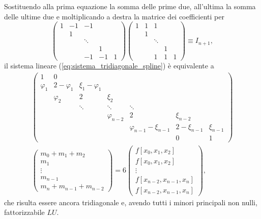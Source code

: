 Sostituendo alla prima equazione la somma delle prime due, all'ultima la somma delle ultime due e moltiplicando a destra la matrice dei coefficienti per
\begin{equation*}
    \begin{pmatrix}
        1 & -1 & -1&&\\
        & 1 &&&\\
        &&\ddots&&\\
        &&&1&\\
        &&-1&-1&1
    \end{pmatrix} \begin{pmatrix}
        1 & 1 & 1&&\\
        & 1 &&&\\
        &&\ddots&&\\
        &&&1&\\
        &&1&1&1
    \end{pmatrix}\equiv I_{n+1},
\end{equation*}
il sistema lineare (\ref{eq:sistema_tridiagonale_spline}) è equivalente a
\begin{equation}
    \begin{matrix}
        \begin{pmatrix}
        1 & 0 & &&&& \\
        \varphi_1 & 2-\varphi_1 & \xi_1-\varphi_1&&&&\\
        &\varphi_2 & 2 &\xi_2&&&\\
        &&\ddots & \ddots &\ddots&&\\
        && & \varphi_{n-2} & 2&\xi_{n-2}&\\
        &&&&\varphi_{n-1}-\xi_{n-1} & 2-\xi_{n-1} &\xi_{n-1}\\
        &&&&& 0 & 1
    \end{pmatrix}\\
    \begin{pmatrix}
        m_0+m_1+m_2\\
        m_1\\
        \vdots\\
        m_{n-1}\\
        m_n+m_{n-1}+m_{n-2}
    \end{pmatrix}=6\begin{pmatrix}
        f[x_0,x_1,x_2]\\
        f[x_0,x_1,x_2]\\
        \vdots\\
        f[x_{n-2},x_{n-1},x_n]\\
        f[x_{n-2},x_{n-1},x_n]
    \end{pmatrix},
    \end{matrix}
\end{equation}
che risulta essere ancora tridiagonale e, avendo tutti i minori principali non nulli, fattorizzabile $LU$.

